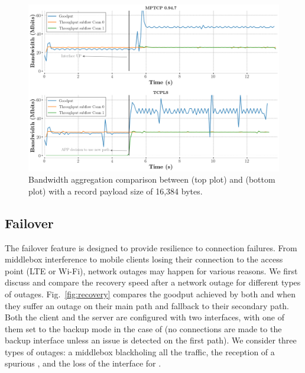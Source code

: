 \begin{figure}[!t]
  \begin{center}
    \includegraphics[width=\columnwidth]{figures/aggregate_dual.png}
  \end{center}
\vspace{-0.5cm}
  \caption{Bandwidth aggregation comparison between \mptcp (top plot) and
    \tcpls (bottom plot) with a record payload size of 16,384 bytes.}
  \label{fig:multipath_aggregation}
\end{figure}

\subsection{Failover}
\label{sec:eval_failover}

The failover feature is designed to provide resilience to \tcpls connection
failures. From middlebox interference to mobile clients losing
their connection to the access point (LTE or Wi-Fi), network outages may happen
for various reasons. We first discuss and compare the recovery speed
after a network outage for different types of outages. Fig.~\ref{fig:recovery}
compares the goodput achieved by both \mptcp and \tcpls when they suffer an
outage on their main path and fallback to their secondary path. Both the client and the server are configured with two interfaces, with one of them set to the backup mode in the case of \mptcp (no connections are made to the backup interface unless an issue is detected on the first path). We consider three types of outages: a middlebox blackholing all the traffic, the reception of a spurious \rst, and the loss of the interface for \mptcp.

